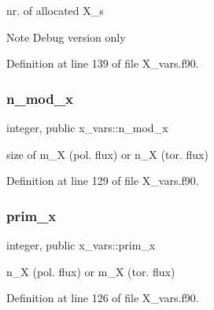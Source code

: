 nr. of allocated {\ttfamily X\+\_}\textquotesingle{}s 

\begin{DoxyNote}{Note}
Debug version only 
\end{DoxyNote}


Definition at line 139 of file X\+\_\+vars.\+f90.

\mbox{\label{namespacex__vars_a2e8fe6c5fe1cf61704bf176925d2b02e}} 
\subsubsection{\texorpdfstring{n\+\_\+mod\+\_\+x}{n\_mod\_x}}
{\footnotesize\ttfamily integer, public x\+\_\+vars\+::n\+\_\+mod\+\_\+x}



size of {\ttfamily m\+\_\+X} (pol. flux) or {\ttfamily n\+\_\+X} (tor. flux) 



Definition at line 129 of file X\+\_\+vars.\+f90.

\mbox{\label{namespacex__vars_ae7f7061534fb3ad68a538cdcea20d1d9}} 
\subsubsection{\texorpdfstring{prim\+\_\+x}{prim\_x}}
{\footnotesize\ttfamily integer, public x\+\_\+vars\+::prim\+\_\+x}



{\ttfamily n\+\_\+X} (pol. flux) or {\ttfamily m\+\_\+X} (tor. flux) 



Definition at line 126 of file X\+\_\+vars.\+f90.

